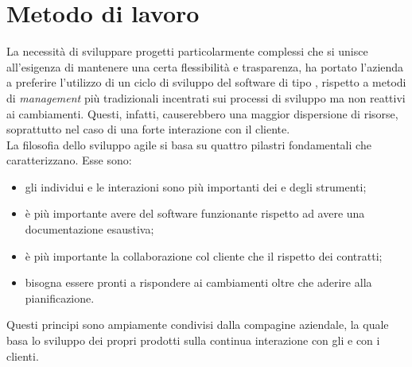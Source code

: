 \section{Metodo di lavoro}
La necessità di sviluppare progetti particolarmente complessi che si unisce all'esigenza di mantenere una certa flessibilità e trasparenza, ha portato l'azienda a preferire l'utilizzo di un ciclo di sviluppo del software di tipo , rispetto a metodi di \emph{management} più tradizionali incentrati sui processi di sviluppo ma non reattivi ai cambiamenti. Questi, infatti, causerebbero una maggior dispersione di risorse, soprattutto nel caso di una forte interazione con il cliente.\\
La filosofia dello sviluppo agile si basa su quattro pilastri fondamentali che caratterizzano.  Esse sono:
\begin{itemize}
	\item gli individui e le interazioni sono più importanti dei  e degli strumenti;
	\item è più importante avere del software funzionante rispetto ad avere una documentazione esaustiva;
	\item è più importante la collaborazione col cliente che il rispetto dei contratti;
	\item bisogna essere pronti a rispondere ai cambiamenti oltre che aderire alla pianificazione.
\end{itemize}
Questi principi sono ampiamente condivisi dalla compagine aziendale, la quale basa lo sviluppo dei propri prodotti sulla continua interazione con gli  e con i clienti.

